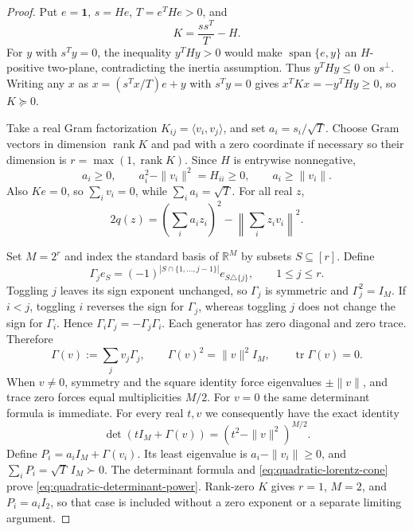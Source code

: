 \documentclass[11pt]{article}
\theoremstyle{remark}
\newcommand{\R}{\mathbb{R}}
\begin{document}
\begin{proof}
Put $e=\mathbf1$, $s=He$, $T=e^THe>0$, and
\[
 K=\frac{ss^T}{T}-H.
\]
For $y$ with $s^Ty=0$, the inequality $y^THy>0$ would make
$\operatorname{span}\{e,y\}$ an $H$-positive two-plane, contradicting
the inertia assumption.  Thus $y^THy\le0$ on $s^\perp$.
Writing any $x$ as $x=(s^Tx/T)e+y$ with $s^Ty=0$ gives
$x^TKx=-y^THy\ge0$, so $K\succeq0$.

Take a real Gram factorization $K_{ij}=\langle v_i,v_j\rangle$,
and set $a_i=s_i/\sqrt T$.
Choose Gram vectors in dimension $\operatorname{rank}K$ and pad with a
zero coordinate if necessary so their dimension is
$r=\max(1,\operatorname{rank}K)$.  Since $H$ is entrywise nonnegative,
\[
 a_i\ge0,\qquad
 a_i^2-\|v_i\|^2=H_{ii}\ge0,\qquad a_i\ge\|v_i\|.
\]
Also $Ke=0$, so $\sum_i v_i=0$, while $\sum_i a_i=\sqrt T$.
For all real $z$,
\begin{equation}
 2q(z)=\left(\sum_i a_iz_i\right)^2
             -\left\|\sum_i z_iv_i\right\|^2.
 \label{eq:quadratic-lorentz-cone}
\end{equation}

Set $M=2^r$ and index the standard basis of $\R^M$ by subsets
$S\subseteq[r]$.  Define
\[
 \Gamma_j e_S
 =(-1)^{|S\cap\{1,\ldots,j-1\}|}e_{S\triangle\{j\}},
 \qquad 1\le j\le r.
\]
Toggling $j$ leaves its sign exponent unchanged, so $\Gamma_j$ is
symmetric and $\Gamma_j^2=I_M$.  If $i<j$, toggling $i$ reverses the
sign for $\Gamma_j$, whereas toggling $j$ does not change the sign for
$\Gamma_i$.  Hence $\Gamma_i\Gamma_j=-\Gamma_j\Gamma_i$.
Each generator has zero diagonal and zero trace.  Therefore
\[
 \Gamma(v):=\sum_jv_j\Gamma_j,\qquad
 \Gamma(v)^2=\|v\|^2I_M,\qquad
 \operatorname{tr}\Gamma(v)=0 .
\]
When $v\ne0$, symmetry and the square identity force eigenvalues
$\pm\|v\|$, and trace zero forces equal multiplicities $M/2$.
For $v=0$ the same determinant formula is immediate.  For every real
$t,v$ we consequently have the exact identity
\[
 \det(tI_M+\Gamma(v))=(t^2-\|v\|^2)^{M/2}.
\]
Define $P_i=a_iI_M+\Gamma(v_i)$.
Its least eigenvalue is $a_i-\|v_i\|\ge0$, and
$\sum_iP_i=\sqrt T\,I_M\succ0$.
The determinant formula and \eqref{eq:quadratic-lorentz-cone} prove
\eqref{eq:quadratic-determinant-power}.
Rank-zero $K$ gives $r=1$, $M=2$, and $P_i=a_iI_2$, so that case
is included without a zero exponent or a separate limiting argument.
\end{proof}
\end{document}
